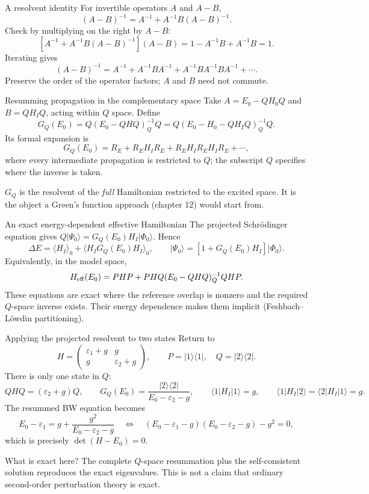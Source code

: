 \documentclass[aspectratio=169,10pt]{beamer}
\newcommand{\mbbox}[1]{%
  \begin{tcolorbox}[colback=paleblue,colframe=uioblue,title={\bfseries Many-body connection}]
  #1
  \end{tcolorbox}}
\newcommand{\ket}[1]{\vert #1\rangle}
\newcommand{\bra}[1]{\langle #1\vert}
\newcommand{\mel}[3]{\langle #1\lvert #2\rvert #3\rangle}
\newcommand{\av}[1]{\langle #1\rangle_0}
\newcommand{\ph}{\Phi_0}
\newcommand{\Psizero}{\Psi_0}
\begin{document}
\begin{frame}{A resolvent identity}
For invertible operators \(A\) and \(A-B\),
\[
\boxed{(A-B)^{-1}=A^{-1}+A^{-1}B(A-B)^{-1}.}
\]
Check by multiplying on the right by \(A-B\):
\[
\left[A^{-1}+A^{-1}B(A-B)^{-1}\right](A-B)
=1-A^{-1}B+A^{-1}B=1.
\]
Iterating gives
\[
(A-B)^{-1}=A^{-1}+A^{-1}BA^{-1}
+A^{-1}BA^{-1}BA^{-1}+\cdots .
\]
\small Preserve the order of the operator factors; \(A\) and \(B\) need not commute.
\end{frame}

\begin{frame}{Resumming propagation in the complementary space}
Take \(A=E_0-QH_0Q\) and \(B=QH_IQ\), acting within \(Q\) space. Define
\[
G_Q(E_0)=Q\left(E_0-QHQ\right)^{-1}_{Q}Q
=Q\left(E_0-H_0-QH_IQ\right)^{-1}_{Q}Q .
\]
Its formal expansion is
\[
G_Q(E_0)=R_E+R_E H_I R_E
+R_E H_I R_E H_I R_E+\cdots,
\]
where every intermediate propagation is restricted to \(Q\); the subscript \(Q\) specifies where the inverse is taken.
\mbbox{\(G_Q\) is the resolvent of the \emph{full} Hamiltonian restricted to the excited space. It is the object a Green's function approach (chapter 12) would start from.}
\end{frame}

\begin{frame}{An exact energy-dependent effective Hamiltonian}
The projected Schr\"odinger equation gives \(Q\ket{\Psizero}=G_Q(E_0)H_I\ket{\ph}\). Hence
\[
\boxed{\Delta E=\av{H_I}+\av{H_I G_Q(E_0)H_I},}
\qquad
\boxed{\ket{\Psizero}=\left[1+G_Q(E_0)H_I\right]\ket{\ph}.}
\]
Equivalently, in the model space,
\[
H_{\rm eff}(E_0)=PHP+PHQ(E_0-QHQ)^{-1}_{Q}QHP .
\]
\small These equations are exact where the reference overlap is nonzero and the required \(Q\)-space inverse exists. Their energy dependence makes them implicit (Feshbach--L\"owdin partitioning).
\end{frame}

\begin{frame}{Applying the projected resolvent to two states}
Return to
\[
H=\begin{pmatrix}\varepsilon_1+g&g\\g&\varepsilon_2+g\end{pmatrix},
\qquad P=\ket{1}\bra{1},\quad Q=\ket{2}\bra{2}.
\]
There is only one state in \(Q\):
\[
QHQ=(\varepsilon_2+g)Q,\qquad
G_Q(E_0)=\frac{\ket{2}\bra{2}}{E_0-\varepsilon_2-g},
\qquad
\mel{1}{H_I}{1}=g,\qquad
\mel{1}{H_I}{2}=\mel{2}{H_I}{1}=g.
\]
The resummed BW equation becomes
\[
E_0-\varepsilon_1=g+\frac{g^2}{E_0-\varepsilon_2-g}
\quad\Longleftrightarrow\quad
\boxed{(E_0-\varepsilon_1-g)(E_0-\varepsilon_2-g)-g^2=0,}
\]
which is precisely \(\det(H-E_0)=0\).
\begin{block}{What is exact here?}
The complete \(Q\)-space resummation plus the self-consistent solution reproduces the exact eigenvalues. This is not a claim that ordinary second-order perturbation theory is exact.
\end{block}
\end{frame}
\end{document}
